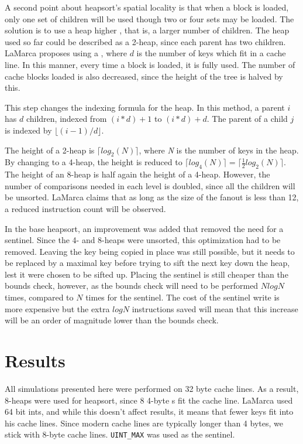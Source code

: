 A second point about heapsort's spatial locality is that when a block is loaded,
only one set of children will be used though two or four sets may be loaded. The
solution is to use a heap higher , that is, a larger number of
children.  The heap used so far could be described as a 2-heap, since each
parent has two children.  LaMarca proposes using a , where $d$ is the
number of keys which fit in a cache line. In this manner, every time a block is
loaded, it is fully used. The number of cache blocks loaded is also decreased,
since the height of the tree is halved by this.

This step changes the indexing formula for the heap. In this method, a parent
$i$ has $d$ children, indexed from $(i*d) + 1$ to $(i*d) + d$. The parent of a
child $j$ is indexed by $\lfloor{}(i-1)/d\rfloor{}$.

The height of a 2-heap is $\lceil{}log_2(N)\rceil{}$, where \textit{N} is the
number of keys in the heap. By changing to a 4-heap, the height is reduced to
$\lceil{}log_4(N)\rceil{} = \lceil{}\tfrac{1}{2}log_2(N)\rceil{}$. The height of
an 8-heap is half again the height of a 4-heap. However, the number of
comparisons needed in each level is doubled, since all the children will be
unsorted. LaMarca claims that as long as the size of the fanout is less than
12, a reduced instruction count will be observed.

In the base heapsort, an improvement was added that removed the need for a
sentinel. Since the 4- and 8-heaps were unsorted, this optimization had to be
removed. Leaving the key being copied in place was still possible, but it needs
to be replaced by a maximal key before trying to sift the next key down the
heap, lest it were chosen to be sifted up. Placing the sentinel is still cheaper
than the bounds check, however, as the bounds check will need to be performed
$NlogN$ times, compared to $N$ times for the sentinel. The cost of the sentinel
write is more expensive but the extra $logN$ instructions saved will mean that
this increase will be an order of magnitude lower than the bounds check.


\section{Results}
All simulations presented here were performed on 32 byte cache lines. As a
result, 8-heaps were used for heapsort, since 8 4-byte s fit the cache line.
LaMarca used 64 bit ints, and while this doesn't affect results, it means that
fewer keys fit into his cache lines. Since modern cache lines are typically
longer than 4 bytes, we stick with 8-byte cache lines. \verb!UINT_MAX! was used
as the sentinel.


